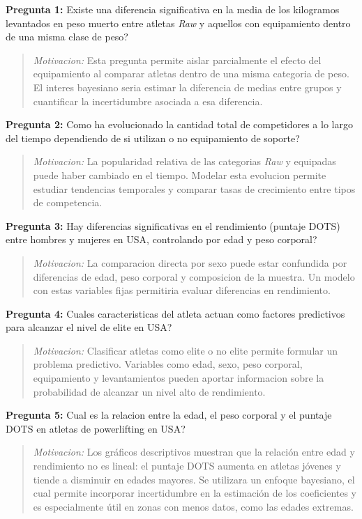 \documentclass[
  spanish,
]{article}
\begin{document}
\textbf{Pregunta 1:} Existe una diferencia significativa en la media de
los kilogramos levantados en peso muerto entre atletas \emph{Raw} y
aquellos con equipamiento dentro de una misma clase de peso?

\begin{quote}
\emph{Motivacion:} Esta pregunta permite aislar parcialmente el efecto
del equipamiento al comparar atletas dentro de una misma categoria de
peso. El interes bayesiano seria estimar la diferencia de medias entre
grupos y cuantificar la incertidumbre asociada a esa diferencia.
\end{quote}

\textbf{Pregunta 2:} Como ha evolucionado la cantidad total de
competidores a lo largo del tiempo dependiendo de si utilizan o no
equipamiento de soporte?

\begin{quote}
\emph{Motivacion:} La popularidad relativa de las categorias \emph{Raw}
y equipadas puede haber cambiado en el tiempo. Modelar esta evolucion
permite estudiar tendencias temporales y comparar tasas de crecimiento
entre tipos de competencia.
\end{quote}

\textbf{Pregunta 3:} Hay diferencias significativas en el rendimiento
(puntaje DOTS) entre hombres y mujeres en USA, controlando por edad y
peso corporal?

\begin{quote}
\emph{Motivacion:} La comparacion directa por sexo puede estar
confundida por diferencias de edad, peso corporal y composicion de la
muestra. Un modelo con estas variables fijas permitiria evaluar
diferencias en rendimiento.
\end{quote}

\textbf{Pregunta 4:} Cuales caracteristicas del atleta actuan como
factores predictivos para alcanzar el nivel de elite en USA?

\begin{quote}
\emph{Motivacion:} Clasificar atletas como elite o no elite permite
formular un problema predictivo. Variables como edad, sexo, peso
corporal, equipamiento y levantamientos pueden aportar informacion sobre
la probabilidad de alcanzar un nivel alto de rendimiento.
\end{quote}

\textbf{Pregunta 5:} Cual es la relacion entre la edad, el peso corporal
y el puntaje DOTS en atletas de powerlifting en USA?

\begin{quote}
\emph{Motivacion:} Los gráficos descriptivos muestran que la relación
entre edad y rendimiento no es lineal: el puntaje DOTS aumenta en
atletas jóvenes y tiende a disminuir en edades mayores. Se utilizara un
enfoque bayesiano, el cual permite incorporar incertidumbre en la
estimación de los coeficientes y es especialmente útil en zonas con
menos datos, como las edades extremas.
\end{quote}
\end{document}
